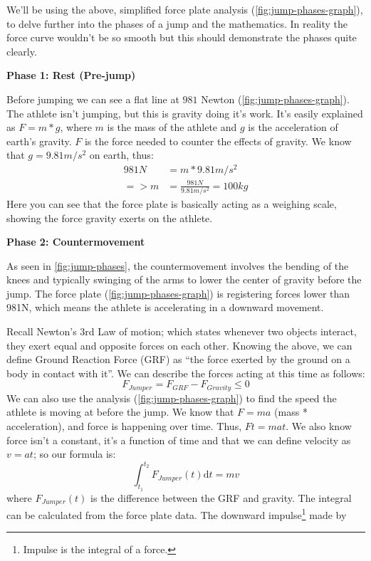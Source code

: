 We'll be using the above, simplified force plate analysis (\cref{fig:jump-phases-graph}),
to delve further into the phases of a jump and the mathematics. 
In reality the force curve wouldn't be so smooth
but this should demonstrate the phases quite clearly.
\par
\textbf{Phase 1: Rest (Pre-jump)}
\par
Before jumping we can see a flat line at $981$ Newton (\cref{fig:jump-phases-graph}). The athlete isn't jumping, but this is gravity doing it's
work. It's easily explained as $F=m*g$, where $m$ is the mass of the athlete and
$g$ is the acceleration of earth's gravity. $F$ is the force needed to counter the effects of gravity. We know that $g=9.81m/s^2$ on earth, thus:
\[
	\displaystyle
	\begin{aligned}
	981N &= m * 9.81 m/s^2 \\
	=> m &= \frac{981N}{9.81 m/s^2} = 100kg
	\end{aligned}	
\]
Here you can see that the force plate is basically acting as a weighing scale, showing
the force gravity exerts on the athlete.
\par
\textbf{Phase 2: Countermovement}
\par
As seen in \cref{fig:jump-phases}, the countermovement involves
the bending of the knees and typically swinging of the arms to lower the center
of gravity before the jump. The force plate (\cref{fig:jump-phases-graph}) is 
registering forces lower than 981N, which means the athlete is accelerating
in a downward movement.
\par
Recall Newton's 3rd Law of motion; 
which states whenever two objects interact, they exert equal and opposite forces on each other.
Knowing the above, we can define Ground Reaction Force (GRF) as ``the force exerted by the ground
on a body in contact with it''. 
We can describe the forces acting at this time as follows:
\[F_{Jumper} = F_{GRF} - F_{Gravity} \leq0 \]
We can also use the analysis (\cref{fig:jump-phases-graph}) to find
the speed the athlete is moving at before the jump. We know that
$F=ma$ (mass * acceleration), and force is happening over time.
Thus, $Ft=mat$.  
We also know force isn't a constant, it's a function of time and that we can define velocity as $v=at$;
so our formula is:
$$\displaystyle
\int_{t_1}^{t_2} F_{Jumper}(t) \mathrm{d}t = mv$$
where $F_{Jumper}(t)$ is the difference between the GRF and gravity.
\pagebreak
The integral can be calculated from the force plate data. The downward impulse\footnote{Impulse is the integral of a force.} made by
